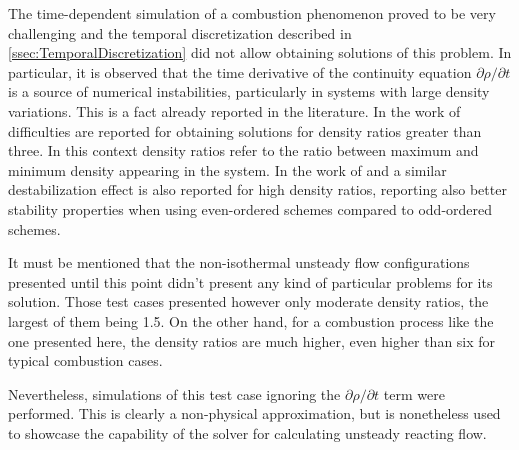 The time-dependent simulation of a combustion phenomenon proved to be very challenging and the temporal discretization described in \cref{ssec:TemporalDiscretization} did not allow obtaining solutions of this problem. 
In particular, it is observed that the time derivative of the continuity equation $\partial\rho /\partial t$ is a source of numerical instabilities, particularly in systems with large density variations. This is a fact already reported in the literature. In the work of \textcite{nicoudConservativeHighOrderFiniteDifference2000} difficulties are reported for obtaining solutions for density ratios greater than three. In this context density ratios refer to the ratio between maximum and minimum density appearing in the system. In the work of \textcite{rauwoensConservativeDiscreteCompatibilityconstraint2009} and \textcite{cookDirectNumericalSimulation1996} a similar destabilization effect is also reported for high density ratios, reporting also better stability properties when using even-ordered schemes compared to odd-ordered schemes.

It must be mentioned that the non-isothermal unsteady flow configurations presented until this point didn't present any kind of particular problems for its solution. Those test cases presented however only moderate density ratios, the largest of them being 1.5. On the other hand, for a combustion process like the one presented here, the density ratios are much higher, even higher than six for typical combustion cases.  

Nevertheless, simulations of this test case ignoring the  $\partial\rho /\partial t$ term were performed. This is clearly a non-physical approximation, but is nonetheless used to showcase the capability of the solver for calculating unsteady reacting flow.
